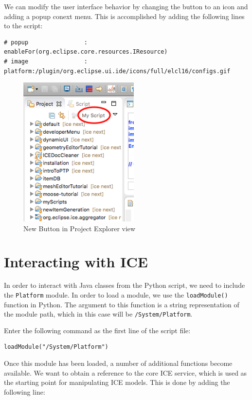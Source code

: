 We can modify the user interface behavior by changing the button to an icon and
adding a popup conext menu. This is accomplished by adding the following lines
to the script:

{\small
\begin{verbatim}
# popup				   : enableFor(org.eclipse.core.resources.IResource) 
# image				   : platform:/plugin/org.eclipse.ui.ide/icons/full/elcl16/configs.gif
\end{verbatim}
}

\begin{figure}[!ht]
\centering
\includegraphics[width=6cm]{images/projexplorer}
\caption{New Button in Project Explorer view}
\label{fig:myscript}
\end{figure}

\section{Interacting with ICE}

In order to interact with Java classes from the Python script, we 
need to include the \texttt{Platform} module. In order to load a module, we use
the \texttt{loadModule()} function in Python. The argument to this function is a
string representation of the module path, which in this case will be
\texttt{/System/Platform}. 

Enter the following command as the first line of the script file:

\lstset{basicstyle=\ttfamily\small, breaklines}

{\small
\begin{verbatim}
loadModule("/System/Platform")
\end{verbatim}
}

Once this module has been loaded, a number of additional functions become
available. We want to obtain a reference to the core ICE service, which is used
as the starting point for manipulating ICE models. This is done by adding the
following line:

